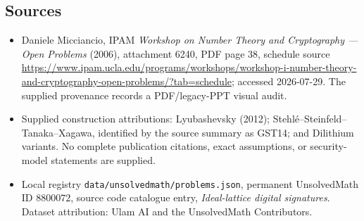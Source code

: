 \documentclass[11pt]{article}
\begin{document}
\subsection{Sources}
\begin{itemize}
\item Daniele Micciancio, IPAM \emph{Workshop on Number Theory and Cryptography --- Open Problems} (2006), attachment 6240, PDF page 38, schedule source \url{https://www.ipam.ucla.edu/programs/workshops/workshop-i-number-theory-and-cryptography-open-problems/?tab=schedule}; accessed 2026-07-29. The supplied provenance records a PDF/legacy-PPT visual audit.
\item Supplied construction attributions: Lyubashevsky (2012); Stehl\'e--Steinfeld--Tanaka--Xagawa, identified by the source summary as GST14; and Dilithium variants. No complete publication citations, exact assumptions, or security-model statements are supplied.
\item Local registry \texttt{data/unsolvedmath/problems.json}, permanent UnsolvedMath ID $8800072$, source code catalogue entry, \emph{Ideal-lattice digital signatures}. Dataset attribution: Ulam AI and the UnsolvedMath Contributors.
\end{itemize}
\end{document}
